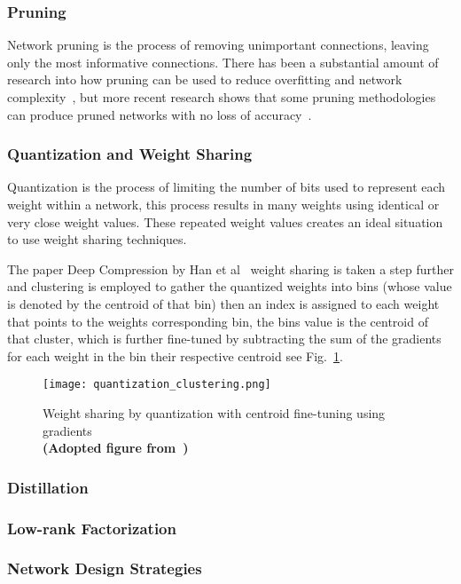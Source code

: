 \documentclass[../../D1.tex]{subfiles}
\begin{document}
\subsubsection{Pruning}\label{sec:Pruning}
Network pruning is the process of removing unimportant connections, leaving only the most informative connections.
There has been a substantial amount of research into how pruning can be used to reduce overfitting and network complexity~\autocite{hansonComparingBiasesMinimal,hassibiSecondOrderDerivatives,lecunOptimalBrainDamage,stromPhonemeProbabilityEstimation1997}, but more recent research shows that some pruning methodologies can produce pruned networks with no loss of accuracy~\autocite{hanLearningBothWeights2015}.

\subsubsection{Quantization and Weight Sharing}\label{sec:Quantization}

Quantization is the process of limiting the number of bits used to represent each weight within a network, this process results in many weights using identical or very close weight values. 
These repeated weight values creates an ideal situation to use weight sharing techniques.

The paper Deep Compression by Han et al~\autocite{hanDeepCompressionCompressing2016} weight sharing is taken a step further and clustering is employed to gather the quantized weights into bins (whose value is denoted by the centroid of that bin) then an index is assigned to each weight that points to the weights corresponding bin, the bins value is the centroid of that cluster, which is further fine-tuned by subtracting the sum of the gradients for each weight in the bin their respective centroid see Fig.~\ref{fig:QuantizationClust}.  

\begin{figure}[H]
    \begin{center}
        \texttt{[image: quantization\_clustering.png]} 
    \end{center}
    
    \caption{Weight sharing by quantization with centroid fine-tuning using gradients\\ \textbf{(Adopted figure from~\autocite{hanDeepCompressionCompressing2016})}}
    \label{fig:QuantizationClust}   
\end{figure}

\subsubsection{Distillation}\label{sec:Distillation}

\subsubsection{Low-rank Factorization}\label{sec:lrFactorization}

\subsubsection{Network Design Strategies}\label{sec:NetworkDesignStrat}
\end{document}
